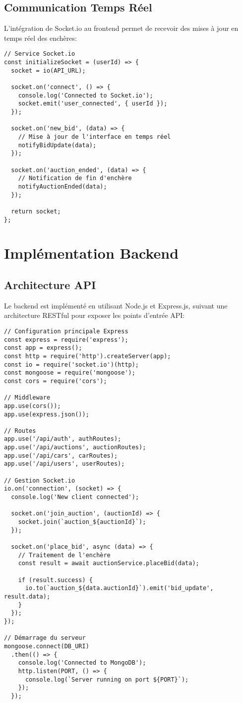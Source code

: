 \subsection{Communication Temps Réel}
L'intégration de Socket.io au frontend permet de recevoir des mises à jour en temps réel des enchères:

\begin{verbatim}
// Service Socket.io
const initializeSocket = (userId) => {
  socket = io(API_URL);
  
  socket.on('connect', () => {
    console.log('Connected to Socket.io');
    socket.emit('user_connected', { userId });
  });
  
  socket.on('new_bid', (data) => {
    // Mise à jour de l'interface en temps réel
    notifyBidUpdate(data);
  });
  
  socket.on('auction_ended', (data) => {
    // Notification de fin d'enchère
    notifyAuctionEnded(data);
  });
  
  return socket;
};
\end{verbatim}

\section{Implémentation Backend}

\subsection{Architecture API}
Le backend est implémenté en utilisant Node.js et Express.js, suivant une architecture RESTful pour exposer les points d'entrée API:

\begin{verbatim}
// Configuration principale Express
const express = require('express');
const app = express();
const http = require('http').createServer(app);
const io = require('socket.io')(http);
const mongoose = require('mongoose');
const cors = require('cors');

// Middleware
app.use(cors());
app.use(express.json());

// Routes
app.use('/api/auth', authRoutes);
app.use('/api/auctions', auctionRoutes);
app.use('/api/cars', carRoutes);
app.use('/api/users', userRoutes);

// Gestion Socket.io
io.on('connection', (socket) => {
  console.log('New client connected');
  
  socket.on('join_auction', (auctionId) => {
    socket.join(`auction_${auctionId}`);
  });
  
  socket.on('place_bid', async (data) => {
    // Traitement de l'enchère
    const result = await auctionService.placeBid(data);
    
    if (result.success) {
      io.to(`auction_${data.auctionId}`).emit('bid_update', result.data);
    }
  });
});

// Démarrage du serveur
mongoose.connect(DB_URI)
  .then(() => {
    console.log('Connected to MongoDB');
    http.listen(PORT, () => {
      console.log(`Server running on port ${PORT}`);
    });
  });
\end{verbatim}

